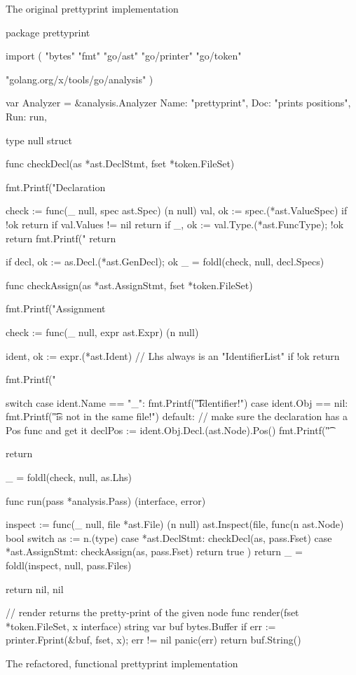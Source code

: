 \begin{code}
	\caption{The original prettyprint implementation\autocite{prettyprint-orig}}
\end{code}
\begin{code}
	\begin{gocode}
package prettyprint

import (
	"bytes"
	"fmt"
	"go/ast"
	"go/printer"
	"go/token"

	"golang.org/x/tools/go/analysis"
)

var Analyzer = &analysis.Analyzer{
	Name: "prettyprint",
	Doc:  "prints positions",
	Run:  run,
}

type null struct{}

func checkDecl(as *ast.DeclStmt, fset *token.FileSet) {
	fmt.Printf("Declaration %

	check := func(_ null, spec ast.Spec) (n null) {
		val, ok := spec.(*ast.ValueSpec)
		if !ok {
			return
		}
		if val.Values != nil {
			return
		}
		if _, ok := val.Type.(*ast.FuncType); !ok {
			return
		}
		fmt.Printf("\tIdent %
		return
	}

	if decl, ok := as.Decl.(*ast.GenDecl); ok {
		_ = foldl(check, null{}, decl.Specs)
	}
}

func checkAssign(as *ast.AssignStmt, fset *token.FileSet) {
	fmt.Printf("Assignment %

	check := func(_ null, expr ast.Expr) (n null) {
		ident, ok := expr.(*ast.Ident) // Lhs always is an "IdentifierList"
		if !ok {
			return
		}

		fmt.Printf("\tIdent %

		switch {
		case ident.Name == "_":
			fmt.Printf("\t\tBlank Identifier!\n")
		case ident.Obj == nil:
			fmt.Printf("\t\tDecl is not in the same file!\n")
		default:
			// make sure the declaration has a Pos func and get it
			declPos := ident.Obj.Decl.(ast.Node).Pos()
			fmt.Printf("\t\tDecl %
		}

		return
	}
	_ = foldl(check, null{}, as.Lhs)
}

func run(pass *analysis.Pass) (interface{}, error) {
	inspect := func(_ null, file *ast.File) (n null) {
		ast.Inspect(file, func(n ast.Node) bool {
			switch as := n.(type) {
			case *ast.DeclStmt:
				checkDecl(as, pass.Fset)
			case *ast.AssignStmt:
				checkAssign(as, pass.Fset)
			}
			return true
		})
		return
	}
	_ = foldl(inspect, null{}, pass.Files)

	return nil, nil
}

// render returns the pretty-print of the given node
func render(fset *token.FileSet, x interface{}) string {
	var buf bytes.Buffer
	if err := printer.Fprint(&buf, fset, x); err != nil {
		panic(err)
	}
	return buf.String()
}
	\end{gocode}
	\caption{The refactored, functional prettyprint implementation\autocite{prettyprint-functional}}
\end{code}

